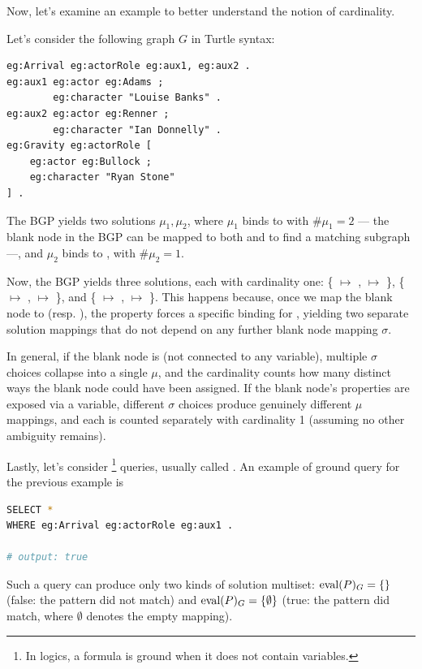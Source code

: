 \noindent
Now, let's examine an example to better understand the notion of cardinality.

\begin{example}{}
    Let's consider the following graph \(G\) in Turtle syntax:
    \begin{lstlisting}[style=csstyle]
eg:Arrival eg:actorRole eg:aux1, eg:aux2 .
eg:aux1 eg:actor eg:Adams ;
        eg:character "Louise Banks" .
eg:aux2 eg:actor eg:Renner ;
        eg:character "Ian Donnelly" .
eg:Gravity eg:actorRole [
    eg:actor eg:Bullock ;
    eg:character "Ryan Stone"
] .
    \end{lstlisting}

    The BGP  yields two solutions \(\mu_1, \mu_2\), where \(\mu_1\) binds  to  with \(\#\mu_1 = 2\) --- the blank node in the BGP can be mapped to both  and  to find a matching subgraph ---, and \(\mu_2\) binds  to , with \(\#\mu_2 = 1\).

    Now, the BGP  yields three solutions, each with cardinality one: \{ \(\mapsto\) ,  \(\mapsto\) \}, \{ \(\mapsto\) ,  \(\mapsto\) \}, and \{ \(\mapsto\) ,  \(\mapsto\) \}.
    This happens because, once we map the blank node to  (resp. ), the property  forces a specific binding for , yielding two separate solution mappings that do not depend on any further blank node mapping \(\sigma\).
    
    In general, if the blank node is  (not connected to any variable), multiple \(\sigma\) choices collapse into a single \(\mu\), and the cardinality counts how many distinct ways the blank node could have been assigned. 
    If the blank node's properties are exposed via a variable, different \(\sigma\) choices produce genuinely different \(\mu\) mappings, and each is counted separately with cardinality 1 (assuming no other ambiguity remains). 
\end{example}

Lastly, let's consider \footnote{In logics, a formula is ground when it does not contain variables.} queries, usually called . An example of ground query for the previous example is 
\begin{lstlisting}[language=bash]
SELECT *
WHERE eg:Arrival eg:actorRole eg:aux1 .

# output: true
\end{lstlisting}
Such a query can produce only two kinds of solution multiset: \(\text{eval}(P)_G = \set{}\) (false: the pattern did not match) and \(\text{eval}(P)_G = \set{\emptyset}\) (true: the pattern did match, where \(\emptyset\) denotes the empty mapping).

